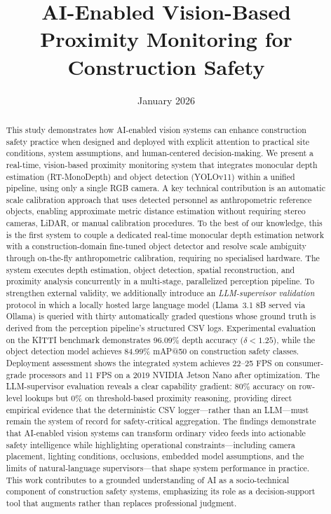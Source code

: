 \documentclass{article}
\title{AI-Enabled Vision-Based Proximity Monitoring for Construction Safety             }
\author{}
\date{January 2026}
\begin{document}
\maketitle

\begin{abstract}
This study demonstrates how AI-enabled vision systems can enhance construction safety practice when designed and deployed with explicit attention to practical site conditions, system assumptions, and human-centered decision-making. We present a real-time, vision-based proximity monitoring system that integrates monocular depth estimation (RT-MonoDepth) and object detection (YOLOv11) within a unified pipeline, using only a single RGB camera. A key technical contribution is an automatic scale calibration approach that uses detected personnel as anthropometric reference objects, enabling approximate metric distance estimation without requiring stereo cameras, LiDAR, or manual calibration procedures. To the best of our knowledge, this is the first system to couple a dedicated real-time monocular depth estimation network with a construction-domain fine-tuned object detector and resolve scale ambiguity through on-the-fly anthropometric calibration, requiring no specialised hardware. The system executes depth estimation, object detection, spatial reconstruction, and proximity analysis concurrently in a multi-stage, parallelized perception pipeline. To strengthen external validity, we additionally introduce an \emph{LLM-supervisor validation} protocol in which a locally hosted large language model (Llama~3.1 8B served via Ollama) is queried with thirty automatically graded questions whose ground truth is derived from the perception pipeline's structured CSV logs. Experimental evaluation on the KITTI benchmark demonstrates 96.09\% depth accuracy ($\delta < 1.25$), while the object detection model achieves 84.99\% mAP@50 on construction safety classes. Deployment assessment shows the integrated system achieves 22--25 FPS on consumer-grade processors and 11 FPS on a 2019 NVIDIA Jetson Nano after optimization. The LLM-supervisor evaluation reveals a clear capability gradient: 80\% accuracy on row-level lookups but 0\% on threshold-based proximity reasoning, providing direct empirical evidence that the deterministic CSV logger---rather than an LLM---must remain the system of record for safety-critical aggregation. The findings demonstrate that AI-enabled vision systems can transform ordinary video feeds into actionable safety intelligence while highlighting operational constraints---including camera placement, lighting conditions, occlusions, embedded model assumptions, and the limits of natural-language supervisors---that shape system performance in practice. This work contributes to a grounded understanding of AI as a socio-technical component of construction safety systems, emphasizing its role as a decision-support tool that augments rather than replaces professional judgment.
\end{abstract}
\end{document}
